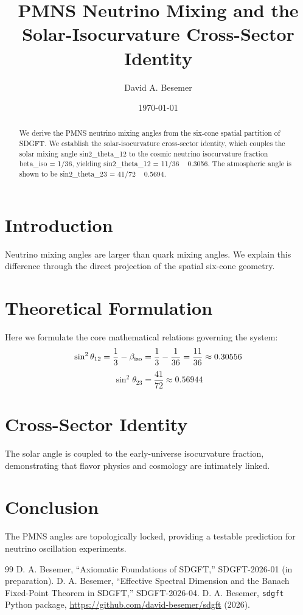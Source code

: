 \documentclass[amsmath,amssymb,aps,prd,twocolumn,superscriptaddress,nofootinbib]{revtex4-2}
\begin{document}

\title{PMNS Neutrino Mixing and the Solar-Isocurvature Cross-Sector Identity}

\author{David A. Besemer}

\date{\today}

\begin{abstract}
We derive the PMNS neutrino mixing angles from the six-cone spatial partition of SDGFT. We establish the solar-isocurvature cross-sector identity, which couples the solar mixing angle sin2_theta_12 to the cosmic neutrino isocurvature fraction beta_iso = 1/36, yielding sin2_theta_12 = 11/36 ~ 0.3056. The atmospheric angle is shown to be sin2_theta_23 = 41/72 ~ 0.5694.
\end{abstract}

\maketitle

\section{Introduction}
Neutrino mixing angles are larger than quark mixing angles. We explain this difference through the direct projection of the spatial six-cone geometry.

\section{Theoretical Formulation}
Here we formulate the core mathematical relations governing the system:
\begin{equation}
  \sin^2\theta_{12} = \frac{1}{3} - \beta_{\mathrm{iso}} = \frac{1}{3} - \frac{1}{36} = \frac{11}{36} \approx 0.30556
\end{equation}
\begin{equation}
  \sin^2\theta_{23} = \frac{41}{72} \approx 0.56944
\end{equation}
\section{Cross-Sector Identity}
The solar angle is coupled to the early-universe isocurvature fraction, demonstrating that flavor physics and cosmology are intimately linked.

\section{Conclusion}
The PMNS angles are topologically locked, providing a testable prediction for neutrino oscillation experiments.



\begin{thebibliography}{99}
 D. A. Besemer, ``Axiomatic Foundations of SDGFT,'' SDGFT-2026-01 (in preparation).
 D. A. Besemer, ``Effective Spectral Dimension and the Banach Fixed-Point Theorem in SDGFT,'' SDGFT-2026-04.
 D. A. Besemer, \texttt{sdgft} Python package, \url{https://github.com/david-besemer/sdgft} (2026).
\end{thebibliography}
\end{document}
